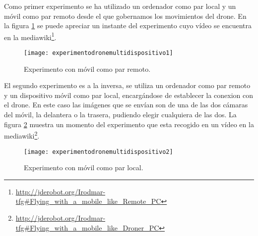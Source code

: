 Como primer experimento se ha utilizado un ordenador como par local y un móvil como par remoto desde el que gobernamos los movimientos del drone. En la figura \ref{fig:experimentodronemultidispositivo1} se puede apreciar un instante del experimento cuyo vídeo se encuentra en la mediawiki\footnote{\url{http://jderobot.org/Irodmar-tfg\#Flying\_with\_a\_mobile\_like\_Remote\_PC}}.\\

\begin{figure}[h!]
\centering
\texttt{[image: experimentodronemultidispositivo1]}
\caption{Experimento con móvil como par remoto.}
\label{fig:experimentodronemultidispositivo1}
\end{figure}

El segundo experimento es a la inversa, se utiliza un ordenador como par remoto y un dispositivo móvil como par local, encargándose de establecer la conexion con el drone. En este caso las imágenes que se envían son de una de las dos cámaras del móvil, la delantera o la trasera, pudiendo elegir cualquiera de las dos. La figura \ref{fig:experimentodronemultidispositivo2} muestra un momento del experimento que esta recogido en un vídeo en la mediawiki\footnote{\url{http://jderobot.org/Irodmar-tfg#Flying_with_a_mobile_like_Droner_PC}}.\\

\begin{figure}[h!]
\centering
\texttt{[image: experimentodronemultidispositivo2]}
\caption{Experimento con móvil como par local.}
\label{fig:experimentodronemultidispositivo2}
\end{figure}